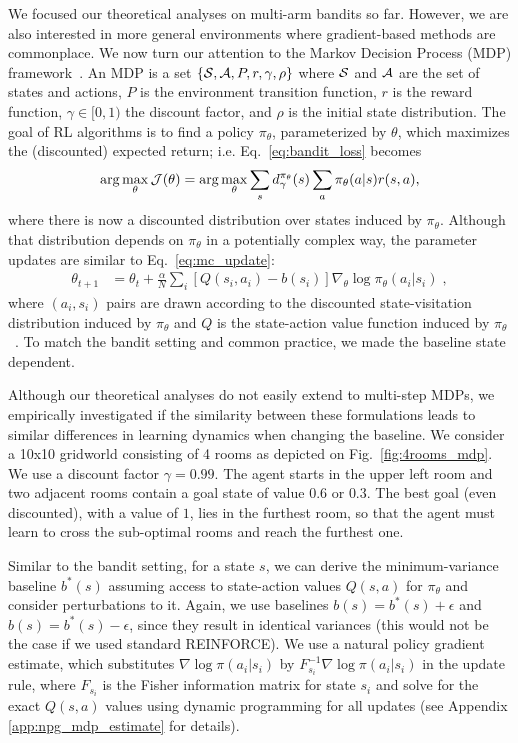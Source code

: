 We focused our theoretical analyses on multi-arm bandits so far. However, we are also interested in more general environments where gradient-based methods are commonplace. 
We now turn our attention to the Markov Decision Process (MDP) framework~\citep{puterman2014markov}. An MDP is a set $\{{\mathcal{S}}, {\mathcal{A}}, P, r, \gamma, \rho\}$ where ${\mathcal{S}}$ and ${\mathcal{A}}$ are the set of states and actions, $P$ is the environment transition function,
$r$ is the reward function, $\gamma \in [0, 1)$ the discount factor,
and $\rho$ is the initial state distribution. The goal of RL algorithms is to find a policy $\pi_\theta$, parameterized by $\theta$, which maximizes the (discounted) expected return; i.e. Eq.~\ref{eq:bandit_loss} becomes
\begin{align*}
    \arg\max_\theta \gJ(\theta)
    = \arg\max_\theta \sum_s d^{\pi_\theta}_\gamma(s)\sum_{a} \pi_\theta(a | s) r(s, a), %
\end{align*}
where there is now a discounted distribution over states induced by $\pi_\theta$. Although that distribution depends on $\pi_\theta$ in a potentially complex way, the parameter updates are similar to Eq.~\ref{eq:mc_update}:
\begin{align*}
    \theta_{t+1} &= \theta_t + \frac{\alpha}{N} \sum_i [Q(s_i, a_i) - b(s_i)]\nabla_\theta \log \pi_\theta(a_i | s_i) \label{eq:mc_update_mdp} \; ,
\end{align*}
where $(a_i, s_i)$ pairs are drawn according to the discounted state-visitation distribution induced by $\pi_\theta$ and $Q$ is the state-action value function induced by $\pi_\theta$~\citep[c.f.][]{sutton18book}. To match the bandit setting and common practice, we made the baseline state dependent. 

Although our theoretical analyses do not easily extend to multi-step MDPs, we empirically investigated if the similarity between these formulations leads to similar differences in learning dynamics when changing the baseline. We consider a 10x10 gridworld consisting of 4 rooms as depicted on Fig.~\ref{fig:4rooms_mdp}. We use a discount factor $\gamma=0.99$. The agent starts in the upper left room and two adjacent rooms contain a goal state of value $0.6$ or $0.3$. The best  goal (even discounted), with a value of $1$, lies in the furthest room, so that the agent must learn to cross the sub-optimal rooms and reach the furthest one. 

Similar to the bandit setting, for a state $s$, we can derive the minimum-variance baseline $b^*(s)$ assuming access to state-action values $Q(s,a)$ for $\pi_\theta$ and consider perturbations to it. Again, we use baselines $b(s) = b^*(s) + \epsilon$ and $b(s) = b^*(s) - \epsilon$, since they result in identical variances (this would not be the case if we used standard REINFORCE). 
We use a natural policy gradient estimate, which substitutes $\nabla \log \pi (a_i|s_i)$ by $F^{-1}_{s_i} \nabla \log \pi(a_i|s_i)$ in the update rule, where $F_{s_i}$ is the Fisher information matrix for state $s_i$ and solve for the exact $Q(s,a)$ values using dynamic programming for all updates (see Appendix \ref{app:npg_mdp_estimate} for details). 


